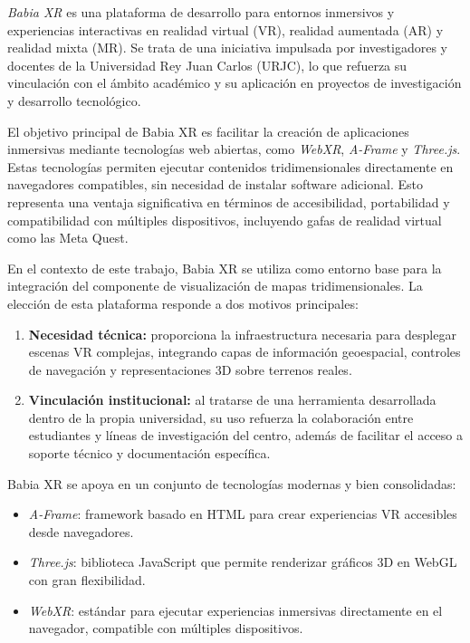 \documentclass[a4paper, 12pt]{book}
\begin{document}
\textit{Babia XR} es una plataforma de desarrollo para entornos inmersivos y experiencias interactivas en realidad virtual (VR), realidad aumentada (AR) y realidad mixta (MR). Se trata de una iniciativa impulsada por investigadores y docentes de la Universidad Rey Juan Carlos (URJC), lo que refuerza su vinculación con el ámbito académico y su aplicación en proyectos de investigación y desarrollo tecnológico.

El objetivo principal de Babia XR es facilitar la creación de aplicaciones inmersivas mediante tecnologías web abiertas, como \textit{WebXR}, \textit{A-Frame} y \textit{Three.js}. Estas tecnologías permiten ejecutar contenidos tridimensionales directamente en navegadores compatibles, sin necesidad de instalar software adicional. Esto representa una ventaja significativa en términos de accesibilidad, portabilidad y compatibilidad con múltiples dispositivos, incluyendo gafas de realidad virtual como las Meta Quest.

En el contexto de este trabajo, Babia XR se utiliza como entorno base para la integración del componente de visualización de mapas tridimensionales. La elección de esta plataforma responde a dos motivos principales:

\begin{enumerate}
  \item \textbf{Necesidad técnica:} proporciona la infraestructura necesaria para desplegar escenas VR complejas, integrando capas de información geoespacial, controles de navegación y representaciones 3D sobre terrenos reales.
  \item \textbf{Vinculación institucional:} al tratarse de una herramienta desarrollada dentro de la propia universidad, su uso refuerza la colaboración entre estudiantes y líneas de investigación del centro, además de facilitar el acceso a soporte técnico y documentación específica.
\end{enumerate}

Babia XR se apoya en un conjunto de tecnologías modernas y bien consolidadas:
\begin{itemize}
  \item \textit{A-Frame}: framework basado en HTML para crear experiencias VR accesibles desde navegadores.
  \item \textit{Three.js}: biblioteca JavaScript que permite renderizar gráficos 3D en WebGL con gran flexibilidad.
  \item \textit{WebXR}: estándar para ejecutar experiencias inmersivas directamente en el navegador, compatible con múltiples dispositivos.
\end{itemize}
\end{document}

